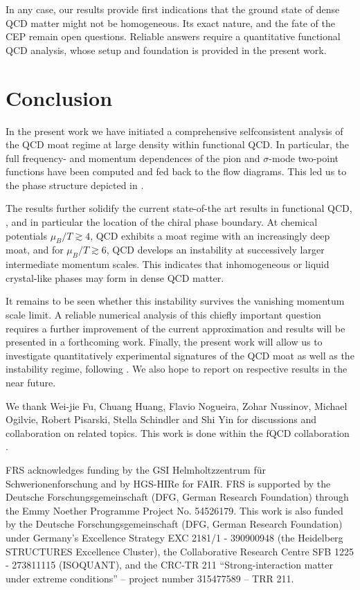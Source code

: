 \documentclass[10pt,prd,superscriptaddress,twocolumn]{revtex4-2}
\begin{document}
In any case, our results provide first indications that the ground state of dense QCD matter might not be homogeneous. Its exact nature, and the fate of the CEP remain open questions.
Reliable answers require a quantitative functional QCD analysis, whose setup and foundation is provided in the present work. 


\section{Conclusion}
\label{sec:conc}

In the present work we have initiated a comprehensive selfconsistent analysis of the QCD moat regime at large density within functional QCD. In particular, the full frequency- and momentum dependences of the pion and $\sigma$-mode two-point functions have been computed and fed back to the flow diagrams. This led us to the phase structure depicted in . 

The results further solidify the current state-of-the art results in functional QCD, \cite{Fu:2019hdw, Gao:2020fbl, Gunkel:2021oya}, and in particular the location of the chiral phase boundary. At chemical potentials $\mu_B/T \gtrsim 4$, QCD exhibits a moat regime with an increasingly deep moat, and for $\mu_B/T \gtrsim 6$, QCD develops an instability at successively larger intermediate momentum scales. This indicates that inhomogeneous or liquid crystal-like phases may form in dense QCD matter. 

It remains to be seen whether this instability survives the vanishing momentum scale limit. A reliable numerical analysis of this chiefly important question requires a further improvement of the current approximation and results will be presented in a forthcoming work. Finally, the present work will allow us to investigate quantitatively experimental signatures of the QCD moat as well as the instability regime, following \cite{Pisarski:2021qof, Rennecke:2023xhc, Nussinov:2024erh}. We also hope to report on respective results in the near future.    


\begin{acknowledgments}
We thank Wei-jie Fu, Chuang Huang, Flavio Nogueira, Zohar Nussinov, Michael Ogilvie, Robert Pisarski, Stella Schindler and Shi Yin for discussions and collaboration on related topics. This work is done within the fQCD collaboration \cite{fQCD}.

FRS acknowledges funding by the GSI Helmholtzzentrum f\"ur Schwerionenforschung and by HGS-HIRe for FAIR. FRS is supported by the Deutsche Forschungsgemeinschaft (DFG, German Research Foundation) through the Emmy Noether Programme Project No. 54526179. 
This work is also funded by the Deutsche Forschungsgemeinschaft (DFG, German Research Foundation) under Germany’s Excellence Strategy EXC 2181/1 - 390900948 (the Heidelberg STRUCTURES Excellence Cluster), the Collaborative Research Centre SFB 1225 - 273811115 (ISOQUANT), and the CRC-TR 211 “Strong-interaction matter under extreme conditions” – project number 315477589 – TRR 211.
\end{acknowledgments}
\end{document}
